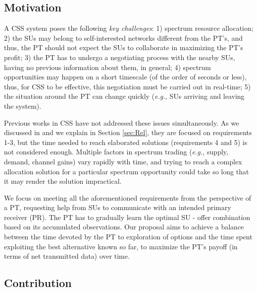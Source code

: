 \subsection{Motivation}
A CSS system poses the following \textit{key challenges}: 1) spectrum resource allocation; 2) the SUs may belong to self-interested networks different from the PT's, and thus, the PT should not expect the SUs to collaborate in maximizing the PT's profit; 3) the PT has to undergo a negotiating process with the nearby SUs, having no previous information about them, in general; 4) spectrum opportunities may happen on a short timescale (of the order of seconds or less), thus, for CSS to be effective, this negotiation must be carried out in real-time; 5) the situation around the PT can change quickly (\textit{e.g.,} SUs arriving and leaving the system). 

Previous works in CSS have not addressed these issues simultaneously. As we discussed in \cite{ref:Mario2014} and we explain in Section \ref{sec:Rel}, they are focused on requirements 1-3, but the time needed to reach elaborated solutions (requirements 4 and 5) is not considered enough. 
Multiple factors in spectrum trading (\textit{e.g.,} supply, demand, channel gains) vary rapidly with time, and trying to reach a complex allocation solution for a particular spectrum opportunity could take so long that it may render the solution impractical.

We focus on meeting all the aforementioned requirements from the perspective of a PT, requesting help from SUs to communicate with an intended primary receiver (PR). The PT has to gradually learn the optimal SU - offer combination based on its accumulated observations. Our proposal aims to achieve a balance between the time devoted by the PT to exploration of options and the time spent exploiting the best alternative known so far, to maximize the PT's payoff (in terms of net transmitted data) over time.

\subsection{Contribution}

